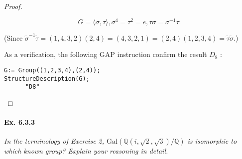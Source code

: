 \documentclass[11pt,a4paper]{article}
\newcommand{\Q}{\mathbb{Q}}
\newcommand{\Gal}{\mathrm{Gal}}
\begin{document}
\begin{proof}
\begin{enumerate}
$$G = \langle \sigma, \tau \rangle, \sigma^4 = \tau^2 = e, \tau \sigma = \sigma^{-1} \tau.$$

(Since $\tilde{\sigma}^{-1} \tilde{\tau} = (1,4,3,2) (2,4)  = (4,3,2,1) =(2,4) (1,2,3,4)= \tilde{\tau} \tilde{\sigma}$.)

As a verification, the following GAP instruction confirm the result $D_8$ : 
\begin{verbatim}
G:= Group((1,2,3,4),(2,4));
StructureDescription(G);
	  "D8"
\end{verbatim}
\end{enumerate}
\end{proof}

\paragraph{Ex. 6.3.3}

{\it In the terminology of Exercise 2, $\Gal(\Q(i,\sqrt{2},\sqrt{3})/\Q)$ is isomorphic to which known group? Explain your reasoning in detail.
}
\end{document}
